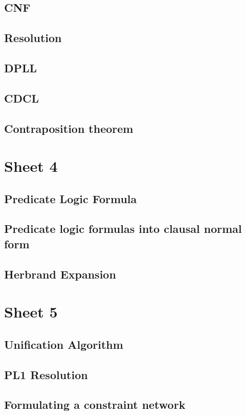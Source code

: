 \documentclass{article}
\begin{document}
    \subsection{CNF}
    \subsection{Resolution}
    \subsection{DPLL}
    \subsection{CDCL}
    \subsection{Contraposition theorem}
    

\section{Sheet 4}
    \subsection{Predicate Logic Formula}
    \subsection{Predicate  logic  formulas  into  clausal  normal  form}
    \subsection{Herbrand Expansion}
    

\section{Sheet 5}
    \subsection{Unification Algorithm}
    \subsection{PL1 Resolution}
    \subsection{Formulating a constraint network}
\end{document}
